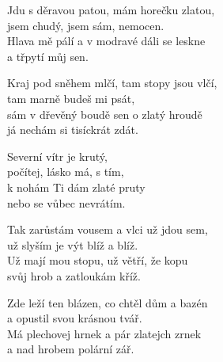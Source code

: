
\ve{}
Jdu s děravou patou, mám horečku zlatou,\\
jsem chudý, jsem sám, nemocen.\\
Hlava mě pálí a v modravé dáli se leskne\\
a třpytí můj sen.

\ve{}
Kraj pod sněhem mlčí, tam stopy jsou vlčí,\\
tam marně budeš mi psát,\\
sám v dřevěný boudě sen o zlatý hroudě\\
já nechám si tisíckrát zdát.

\cho{}
Severní vítr je krutý,\\
počítej, lásko má, s tím,\\
k nohám Ti dám zlaté pruty\\
nebo se vůbec nevrátím.

\ve{}
Tak zarůstám vousem a vlci už jdou sem,\\
už slyším je výt blíž a blíž.\\
Už mají mou stopu, už větří, že kopu\\
svůj hrob a zatloukám kříž.

\ve{} 
Zde leží ten blázen, co chtěl dům a bazén\\
a opustil svou krásnou tvář.\\
Má plechovej hrnek a pár zlatejch zrnek\\
a nad hrobem polární zář.

\cho{}

\esong